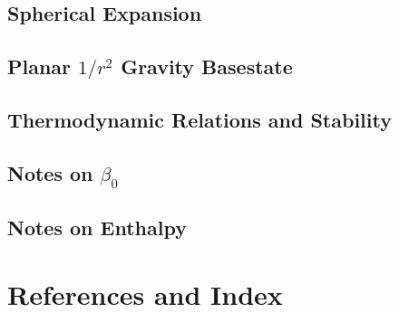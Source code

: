 \documentclass[11pt]{book}    %
\makeatletter
\renewcommand*\cleardoublepage{\clearpage\if@twoside
\ifodd\c@page\else
\hbox{}
\thispagestyle{empty}
\newpage
\if@twocolumn\hbox{}\newpage\fi\fi\fi}
\makeatother
\begin{document}
\chapter{Spherical Expansion}


\chapter{Planar $1/r^2$ Gravity Basestate}


\chapter{Thermodynamic Relations and Stability}


\chapter{Notes on $\beta_0$}


\chapter{Notes on Enthalpy}


\backmatter

\part{References and Index}

\renewcommand\bibname{References}



\cleardoublepage
{}
{}
\printindex
\end{document}
